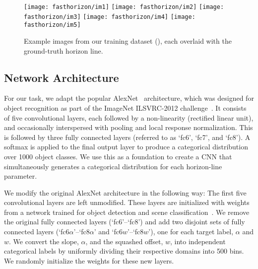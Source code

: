 

\begin{figure*}
  \hfill
  \texttt{[image: fasthorizon/im1]}
  \hfill
  \texttt{[image: fasthorizon/im2]}
  \hfill
  \texttt{[image: fasthorizon/im3]}
  \hfill
  \texttt{[image: fasthorizon/im4]}
  \hfill
  \texttt{[image: fasthorizon/im5]}
  \hfill
  \caption{Example images from our training dataset
    (), each overlaid with the ground-truth horizon line.
  }
  \label{fig:dataset}
\end{figure*}

\subsection{Network Architecture}

For our task, we adapt the popular
AlexNet~\cite{krizhevsky2012imagenet} architecture, which was designed
for object recognition as part of the ImageNet ILSVRC-2012
challenge~\cite{russakovsky2015imagenet}. It consists of five
convolutional layers, each followed by a non-linearity (rectified
linear unit), and occasionally interspersed with pooling and local
response normalization. This is followed by three fully connected
layers (referred to as `fc6', `fc7', and `fc8'). A softmax is applied
to the final output layer to produce a categorical distribution over
1000 object classes.  We use this as a foundation to create a CNN that
simultaneously generates a categorical distribution for each
horizon-line parameter.

We modify the original AlexNet architecture in the following way: The
first five convolutional layers are left unmodified. These layers are
initialized with weights from a network trained for object detection
and scene classification~\cite{zhou2014places}. We remove the original
fully connected layers (`fc6'--`fc8') and add two disjoint sets of
fully connected layers (`fc6$\alpha$'--`fc8$\alpha$' and
`fc6$w$'--`fc8$w$'), one for each target label, $\alpha$ and $w$.  We
convert the slope, $\alpha$, and the squashed offset, $w$, into
independent categorical labels by uniformly dividing their respective
domains into 500 bins.  We randomly initialize the weights for these
new layers.

